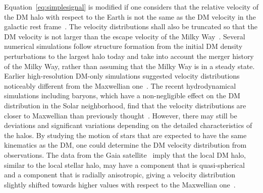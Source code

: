 Equation~\eqref{eq:simplesignal} 
is modified if one considers that the relative velocity of the DM halo with 
respect to the Earth is not the same as the DM velocity in the galactic rest 
frame~\cite{SignalLineShapeI}. The velocity distributions shall also be 
truncated so that the DM velocity is not larger than the escape velocity of 
the Milky Way~\cite{Lisanti:2016jxe}. 
Several numerical simulations follow structure formation from the initial DM 
density perturbations to the largest halo today and take into account the 
merger history of the Milky Way, rather than assuming that the Milky Way is 
in a steady state. 
Earlier high-resolution DM-only simulations suggested velocity 
distributions noticeably different from the Maxwellian 
one~\cite{PDG,Lisanti:2016jxe,Green:2017odb}. 
The recent hydrodynamical simulations including baryons, 
which have a non-negligible effect on the DM distribution 
in the Solar neighborhood, find that 
the velocity distributions are closer to Maxwellian than 
 previously thought~\cite{PDG,Green:2017odb}. However, there may still be 
deviations and significant variations depending on the detailed 
characteristics of the halos. By studying the motion of stars that 
are expected to have the same kinematics as the DM, 
one could determine the DM velocity distribution from observations. 
The data from the Gaia satellite~\cite{GAIA} imply that the local DM halo, 
similar to the local stellar halo, may have 
a component that is quasi-spherical and a component that is radially anisotropic, 
giving a velocity distribution slightly shifted towards higher values 
with respect to the Maxwellian one~\cite{Evans:2018bqy}.  

